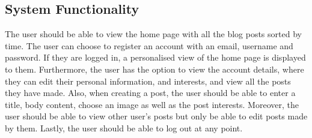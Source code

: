 \subsection{System Functionality}
The user should be able to view the home page with all the blog posts sorted by time. The user can choose to register an account with an email, username and password. If they are logged in, a personalised view of the home page is displayed to them. Furthermore, the user has the option to view the account details, where they can edit their personal information, and interests, and view all the posts they have made. Also, when creating a post, the user should be able to enter a title, body content, choose an image as well as the post interests. Moreover, the user should be able to view other user's posts but only be able to edit posts made by them. Lastly, the user should be able to log out at any point.
